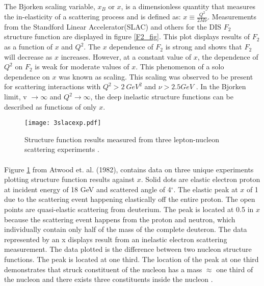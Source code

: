 \paragraph{}The Bjorken scaling variable, $x_B$ or $x$, is a dimensionless quantity that measures the in-elasticity of a scattering process and is defined as: $x \equiv \frac{Q^2}{2M\nu}$. Measurements from the Standford Linear Accelerator(SLAC) and others for the DIS $F_2$ structure function are displayed in figure \ref{F2_fig}. This plot displays results of $F_2$ as a function of $x$ and $Q^2$. The $x$ dependence of $F_2$ is strong and shows that $F_2$ will decrease as $x$ increases. However, at a constant value of $x$, the dependence of $Q^2$ on $F_2$ is weak for moderate values of $x$. This phenomenon of a solo dependence on $x$ was known as scaling. This scaling was observed to be present for scattering interactions with $Q^2 > 2 \: GeV^2$  and $\nu > 2.5 GeV$ \cite{Atwood}. In the Bjorken limit, v $\rightarrow \infty$ and $Q^2 \rightarrow \infty$, the deep inelastic structure functions can be described as functions of only $x$.
\begin{figure}[t]
	\centering
	\texttt{[image: 3slacexp.pdf]} 
	\caption{ Structure function results measured from three  lepton-nucleon scattering experiments \cite{Atwood}.}
	\label{3leps}
\end{figure}
\paragraph{}Figure \ref{3leps} from Atwood et. al. (1982), contains data on three unique experiments plotting structure function results against $x$. Solid dots are elastic electron proton at incident energy of 18 GeV and scattered angle of 4$^\circ$. The elastic peak at $x$ of 1 due to the scattering event happening elastically off the entire proton. The open points are quasi-elastic scattering from deuterium. The peak is located at 0.5 in $x$ because the scattering event happens from the proton and neutron, which individually contain only half of the mass of the complete deuteron. The data represented by an x displays result from an inelastic electron scattering measurement. The data plotted is the difference between two nucleon structure functions. The peak is located at one third. The location of the peak at one third demonstrates that struck constituent of the nucleon  has a mass $\approx$ one third of the nucleon and there exists three constituents inside the nucleon \cite{Atwood,PnN}.

